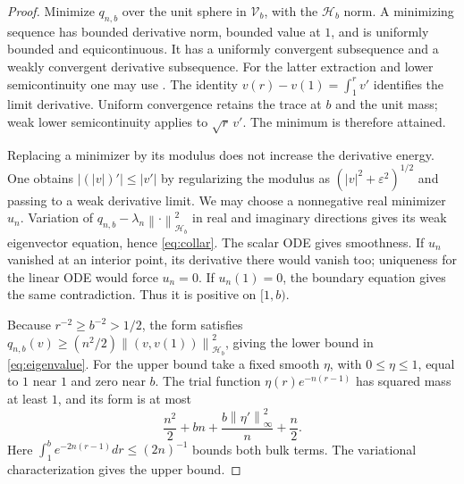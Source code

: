 \documentclass[11pt]{article}
\newcommand{\HH}{\mathcal H}
\newcommand{\norm}[1]{\left\|#1\right\|}
\begin{document}
\begin{proof}
Minimize \(q_{n,b}\) over the unit sphere in \(\mathcal V_b\), with the
\(\HH_b\) norm. A minimizing sequence has bounded derivative norm, bounded
value at \(1\), and is uniformly bounded and equicontinuous. It has a
uniformly convergent subsequence and a weakly convergent derivative
subsequence. For the latter extraction and lower semicontinuity one may use
\cite[Lemmas 1.12--1.13]{Teschl}. The identity
\(v(r)-v(1)=\int_1^r v'\) identifies the limit derivative. Uniform
convergence retains the trace at \(b\) and the unit mass; weak lower
semicontinuity applies to \(\sqrt r\,v'\). The minimum is therefore attained.

Replacing a minimizer by its modulus does not increase the derivative
energy. One obtains \(|(|v|)'|\le|v'|\) by regularizing the modulus as
\((|v|^2+\varepsilon^2)^{1/2}\) and passing to a weak derivative limit.
We may choose a nonnegative real minimizer \(u_n\). Variation of
\(q_{n,b}-\lambda_n\norm{\cdot}_{\HH_b}^2\) in real and imaginary
directions gives its weak eigenvector equation, hence \eqref{eq:collar}.
The scalar ODE gives smoothness. If \(u_n\) vanished at an interior point,
its derivative there would vanish too; uniqueness for the linear ODE
would force \(u_n=0\). If \(u_n(1)=0\), the boundary equation gives the same
contradiction. Thus it is positive on \([1,b)\).

Because \(r^{-2}\ge b^{-2}>1/2\), the form satisfies
\(q_{n,b}(v)\ge(n^2/2)\norm{(v,v(1))}_{\HH_b}^2\), giving the lower bound
in \eqref{eq:eigenvalue}. For the upper bound take a fixed smooth
\(\eta\), with \(0\le\eta\le1\), equal to \(1\) near \(1\) and zero
near \(b\). The trial function \(\eta(r)e^{-n(r-1)}\) has squared mass at
least \(1\), and its form is at most
\[
\frac{n^2}{2}+bn+\frac{b\norm{\eta'}_\infty^2}{n}+\frac n2.
\]
Here \(\int_1^b e^{-2n(r-1)}dr\le(2n)^{-1}\) bounds both bulk terms.
The variational characterization gives the upper bound.
\end{proof}
\end{document}
